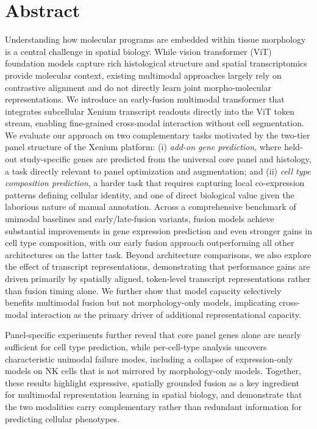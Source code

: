 \section*{Abstract}
\label{sec:abstract-1}
Understanding how molecular programs are embedded within tissue morphology is a central challenge in spatial biology. While vision transformer (ViT) foundation models capture rich histological structure and spatial transcriptomics provide molecular context, existing multimodal approaches largely rely on contrastive alignment and do not directly learn joint morpho-molecular representations. We introduce an early-fusion multimodal transformer that integrates subcellular Xenium transcript readouts directly into the ViT token stream, enabling fine-grained cross-modal interaction without cell segmentation. We evaluate our approach on two complementary tasks motivated by the two-tier panel structure of the Xenium platform: (i) \emph{add-on gene prediction}, where held-out study-specific genes are predicted from the universal core panel and histology, a task directly relevant to panel optimization and augmentation; and (ii) \emph{cell type composition prediction}, a harder task that requires capturing local co-expression patterns defining cellular identity, and one of direct biological value given the laborious nature of manual annotation. Across a comprehensive benchmark of unimodal baselines and early/late-fusion variants, fusion models achieve substantial improvements in gene expression prediction and even stronger gains in cell type composition, with our early fusion approach outperforming all other architectures on the latter task. Beyond architecture comparisons, we also explore the effect of transcript representations, demonstrating that performance gains are driven primarily by spatially aligned, token-level transcript representations rather than fusion timing alone. We further show that model capacity selectively benefits multimodal fusion but not morphology-only models, implicating cross-modal interaction as the primary driver of additional representational capacity.

Panel-specific experiments further reveal that core panel genes alone are nearly sufficient for cell type prediction, while per-cell-type analysis uncovers characteristic unimodal failure modes, including a collapse of expression-only models on NK cells that is not mirrored by morphology-only models. Together, these results highlight expressive, spatially grounded fusion as a key ingredient for multimodal representation learning in spatial biology, and demonstrate that the two modalities carry complementary rather than redundant information for predicting cellular phenotypes.

